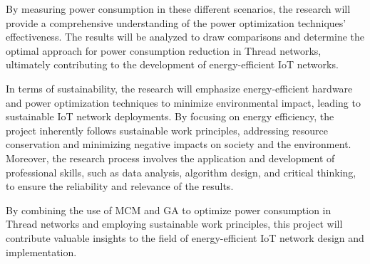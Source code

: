 By measuring power consumption in these different scenarios, the research will provide a comprehensive understanding of the power optimization techniques' effectiveness. The results will be analyzed to draw comparisons and determine the optimal approach for power consumption reduction in Thread networks, ultimately contributing to the development of energy-efficient \gls{IoT} networks.

In terms of sustainability, the research will emphasize energy-efficient hardware and power optimization techniques to minimize environmental impact, leading to sustainable \gls{IoT} network deployments. By focusing on energy efficiency, the project inherently follows sustainable work principles, addressing resource conservation and minimizing negative impacts on society and the environment. Moreover, the research process involves the application and development of professional skills, such as data analysis, algorithm design, and critical thinking, to ensure the reliability and relevance of the results.

By combining the use of \gls{MCM} and \gls{GA} to optimize power consumption in Thread networks and employing sustainable work principles, this project will contribute valuable insights to the field of energy-efficient \gls{IoT} network design and implementation.
